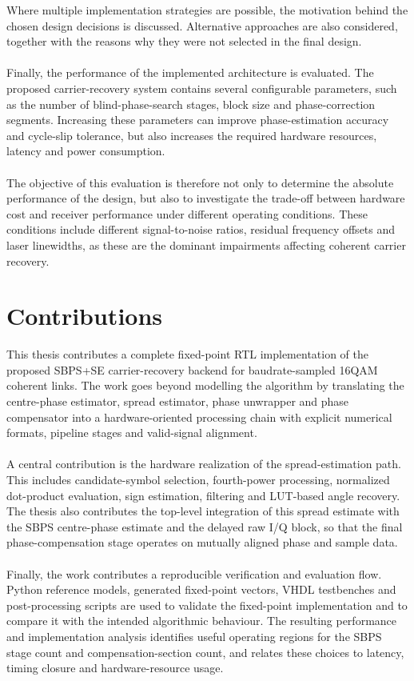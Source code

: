 Where multiple implementation strategies are possible, the motivation behind the chosen design decisions is discussed. Alternative approaches are also considered, together with the reasons why they were not selected in the final design.
\\\\
Finally, the performance of the implemented architecture is evaluated. The proposed carrier-recovery system contains several configurable parameters, such as the number of blind-phase-search stages, block size and phase-correction segments. Increasing these parameters can improve phase-estimation accuracy and cycle-slip tolerance, but also increases the required hardware resources, latency and power consumption.
\\\\
The objective of this evaluation is therefore not only to determine the absolute performance of the design, but also to investigate the trade-off between hardware cost and receiver performance under different operating conditions. These conditions include different signal-to-noise ratios, residual frequency offsets and laser linewidths, as these are the dominant impairments affecting coherent carrier recovery.

\section{Contributions}
This thesis contributes a complete fixed-point \ac{RTL} implementation of the proposed \ac{SBPS}+\ac{SE} carrier-recovery backend for baudrate-sampled \ac{16QAM} coherent links. The work goes beyond modelling the algorithm by translating the centre-phase estimator, spread estimator, phase unwrapper and phase compensator into a hardware-oriented processing chain with explicit numerical formats, pipeline stages and valid-signal alignment.
\\\\
A central contribution is the hardware realization of the spread-estimation path. This includes candidate-symbol selection, fourth-power processing, normalized dot-product evaluation, sign estimation, filtering and \ac{LUT}-based angle recovery. The thesis also contributes the top-level integration of this spread estimate with the \ac{SBPS} centre-phase estimate and the delayed raw I/Q block, so that the final phase-compensation stage operates on mutually aligned phase and sample data.
\\\\
Finally, the work contributes a reproducible verification and evaluation flow. Python reference models, generated fixed-point vectors, \ac{VHDL} testbenches and post-processing scripts are used to validate the fixed-point implementation and to compare it with the intended algorithmic behaviour. The resulting performance and implementation analysis identifies useful operating regions for the \ac{SBPS} stage count and compensation-section count, and relates these choices to latency, timing closure and hardware-resource usage.

